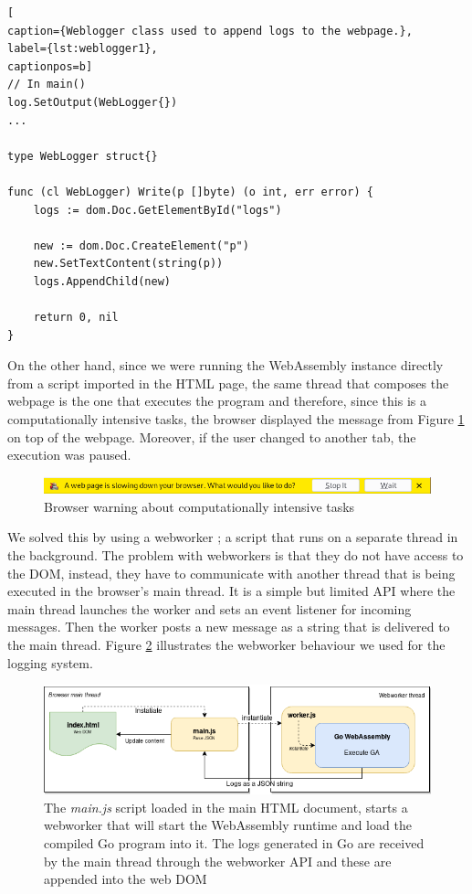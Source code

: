 \begin{lstlisting}[
caption={Weblogger class used to append logs to the webpage.},
label={lst:weblogger1},
captionpos=b]
// In main()
log.SetOutput(WebLogger{})
...

type WebLogger struct{}

func (cl WebLogger) Write(p []byte) (o int, err error) {
	logs := dom.Doc.GetElementById("logs")

	new := dom.Doc.CreateElement("p")
	new.SetTextContent(string(p))
	logs.AppendChild(new)

	return 0, nil
}
\end{lstlisting} 

On the other hand, since we were running the WebAssembly instance directly from a script imported in the HTML page, the same thread that composes the webpage is the one that executes the program and therefore, since this is a computationally intensive tasks, the browser displayed the message from Figure \ref{fig:kill-task} on top of the webpage. Moreover, if the user changed to another tab, the execution was paused.

\begin{figure}[h!]
		\centering
    	\includegraphics[width=\linewidth]{assets/images/browser-warning.png}
    	\caption{Browser warning about computationally intensive tasks}
    	\label{fig:kill-task}
\end{figure} 

We solved this by using a webworker \cite{webworker}; a script that runs on a separate thread in the background. The problem with webworkers is that they do not have access to the DOM, instead, they have to communicate with another thread that is being executed in the browser's main thread. It is a simple but limited API where the main thread launches the worker and sets an event listener for incoming messages. Then the worker posts a new message as a string that is delivered to the main thread. Figure \ref{fig:logging-system} illustrates the webworker behaviour we used for the logging system.

\begin{figure}[h!]
		\centering
    	\includegraphics[width=\linewidth]{assets/images/logging-system.png}
    	\caption{The \textit{main.js} script loaded in the main HTML document, starts a webworker that will start the WebAssembly runtime and load the compiled Go program into it. The logs generated in Go are received by the main thread through the webworker API and these are appended into the web DOM}
    	\label{fig:logging-system}
\end{figure} 


